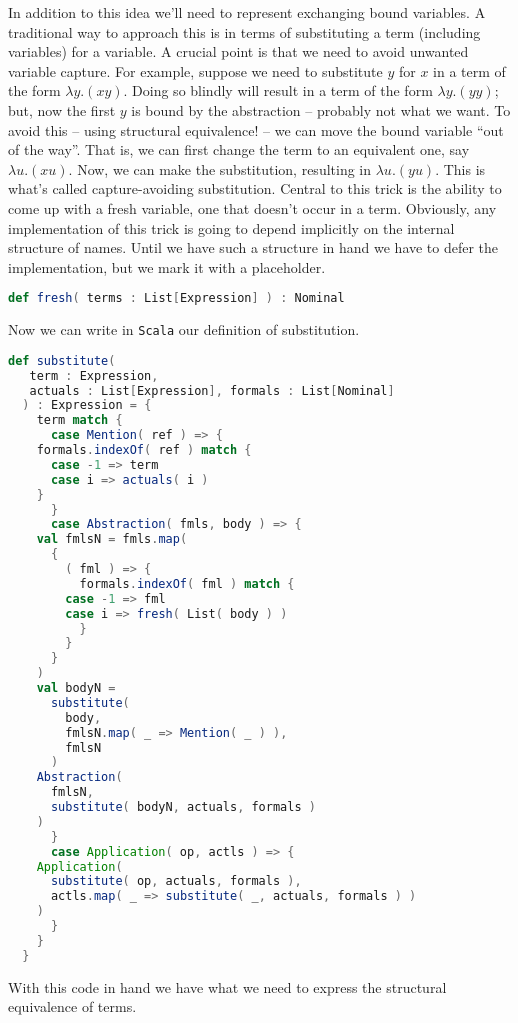 In addition to this idea we'll need to represent exchanging bound
variables. A traditional way to approach this is in terms of
substituting a term (including variables) for a variable. A crucial
point is that we need to avoid unwanted variable capture. For example,
suppose we need to substitute $y$ for $x$ in a term of the form
$\lambda y.(x y)$. Doing so blindly will result in a term of the form
$\lambda y.(y y)$; but, now the first $y$ is bound by the abstraction
-- probably not what we want. To avoid this -- using structural
equivalence! -- we can move the bound variable ``out of the
way''. That is, we can first change the term to an equivalent one, say
$\lambda u.(x u)$. Now, we can make the substitution, resulting in
$\lambda u.(y u)$. This is what's called capture-avoiding
substitution. Central to this trick is the ability to come up with a
fresh variable, one that doesn't occur in a term. Obviously, any
implementation of this trick is going to depend implicitly on the
internal structure of names. Until we have such a structure in hand we
have to defer the implementation, but we mark it with a placeholder.

\begin{lstlisting}[language=Scala]
  def fresh( terms : List[Expression] ) : Nominal
\end{lstlisting}

Now we can write in \texttt{Scala} our definition of substitution.

\break
\begin{lstlisting}[language=Scala]
   def substitute(
   term : Expression,
   actuals : List[Expression], formals : List[Nominal]
  ) : Expression = {
    term match {
      case Mention( ref ) => {
	formals.indexOf( ref ) match {
	  case -1 => term
	  case i => actuals( i )
	}
      }
      case Abstraction( fmls, body ) => {
	val fmlsN = fmls.map(
	  {
	    ( fml ) => {
	      formals.indexOf( fml ) match {
		case -1 => fml
		case i => fresh( List( body ) )
	      }
	    }
	  }	      
	)
	val bodyN =
	  substitute(
	    body,
	    fmlsN.map( _ => Mention( _ ) ),
	    fmlsN
	  )
	Abstraction(
	  fmlsN,
	  substitute( bodyN, actuals, formals )
	)
      }
      case Application( op, actls ) => {
	Application(
	  substitute( op, actuals, formals ),
	  actls.map( _ => substitute( _, actuals, formals ) )
	)
      }
    }
  }
\end{lstlisting}

With this code in hand we have what we need to express the structural
equivalence of terms.

